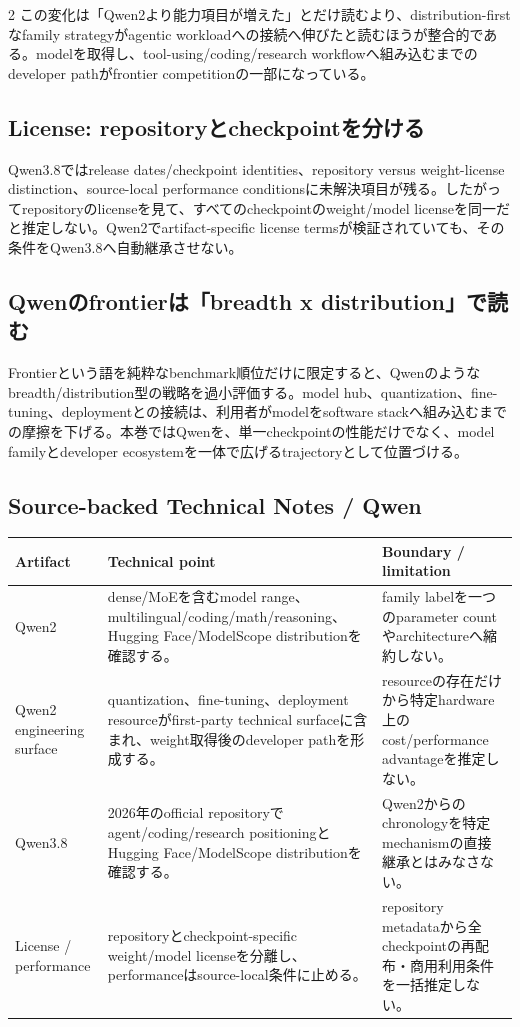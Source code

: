 \documentclass[lualatex,a4paper,10pt]{jlreq}
\begin{document}
\begin{multicols}{2}
この変化は「Qwen2より能力項目が増えた」とだけ読むより、distribution-firstなfamily strategyがagentic workloadへの接続へ伸びたと読むほうが整合的である。modelを取得し、tool-using/coding/research workflowへ組み込むまでのdeveloper pathがfrontier competitionの一部になっている。

\subsection{License: repositoryとcheckpointを分ける}
Qwen3.8ではrelease dates/checkpoint identities、repository versus weight-license distinction、source-local performance conditionsに未解決項目が残る。したがってrepositoryのlicenseを見て、すべてのcheckpointのweight/model licenseを同一だと推定しない。Qwen2でartifact-specific license termsが検証されていても、その条件をQwen3.8へ自動継承させない。\autocite{qwen2,qwen38}

\subsection{Qwenのfrontierは「breadth x distribution」で読む}
Frontierという語を純粋なbenchmark順位だけに限定すると、Qwenのようなbreadth/distribution型の戦略を過小評価する。model hub、quantization、fine-tuning、deploymentとの接続は、利用者がmodelをsoftware stackへ組み込むまでの摩擦を下げる。本巻ではQwenを、単一checkpointの性能だけでなく、model familyとdeveloper ecosystemを一体で広げるtrajectoryとして位置づける。

\end{multicols}

\subsection*{Source-backed Technical Notes / Qwen}
\small
\begin{tabularx}{\textwidth}{@{}>{\raggedright\arraybackslash}p{}>{\raggedright\arraybackslash}p{}>{\raggedright\arraybackslash}X@{}}
\toprule
Artifact & Technical point & Boundary / limitation \\
\midrule
Qwen2 & dense/MoEを含むmodel range、multilingual/coding/math/reasoning、Hugging Face/ModelScope distributionを確認する。 & family labelを一つのparameter countやarchitectureへ縮約しない。 \\
Qwen2 engineering surface & quantization、fine-tuning、deployment resourceがfirst-party technical surfaceに含まれ、weight取得後のdeveloper pathを形成する。 & resourceの存在だけから特定hardware上のcost/performance advantageを推定しない。 \\
Qwen3.8 & 2026年のofficial repositoryでagent/coding/research positioningとHugging Face/ModelScope distributionを確認する。 & Qwen2からのchronologyを特定mechanismの直接継承とはみなさない。 \\
License / performance & repositoryとcheckpoint-specific weight/model licenseを分離し、performanceはsource-local条件に止める。 & repository metadataから全checkpointの再配布・商用利用条件を一括推定しない。 \\
\bottomrule
\end{tabularx}
\normalsize
\autocite{qwen2,qwen38}
\end{document}
